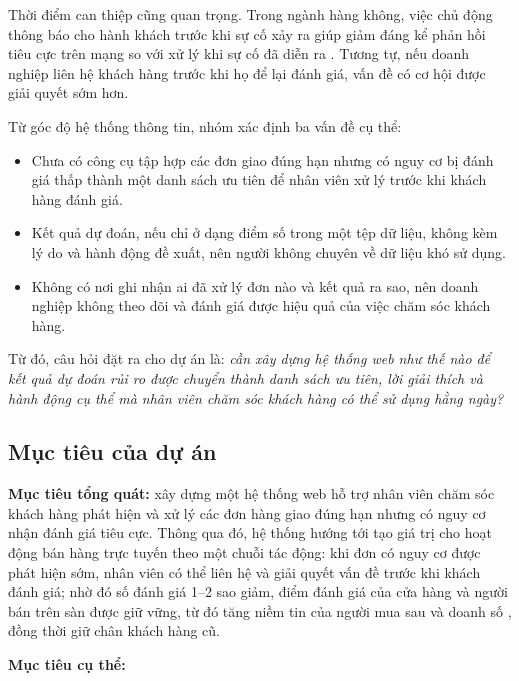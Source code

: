 Thời điểm can thiệp cũng quan trọng. Trong ngành hàng không, việc chủ động thông báo cho
hành khách trước khi sự cố xảy ra giúp giảm đáng kể phản hồi tiêu cực trên mạng so với
xử lý khi sự cố đã diễn ra \parencite{nazifi2021}. Tương tự, nếu doanh nghiệp liên hệ
khách hàng trước khi họ để lại đánh giá, vấn đề có cơ hội được giải quyết sớm hơn.

Từ góc độ hệ thống thông tin, nhóm xác định ba vấn đề cụ thể:

\begin{itemize}
    \item Chưa có công cụ tập hợp các đơn giao đúng hạn nhưng có nguy cơ bị đánh giá thấp
    thành một danh sách ưu tiên để nhân viên xử lý trước khi khách hàng đánh giá.
    \item Kết quả dự đoán, nếu chỉ ở dạng điểm số trong một tệp dữ liệu, không kèm lý do và
    hành động đề xuất, nên người không chuyên về dữ liệu khó sử dụng.
    \item Không có nơi ghi nhận ai đã xử lý đơn nào và kết quả ra sao, nên doanh nghiệp không
    theo dõi và đánh giá được hiệu quả của việc chăm sóc khách hàng.
\end{itemize}

Từ đó, câu hỏi đặt ra cho dự án là: \textit{cần xây dựng hệ thống web như thế nào để kết quả
dự đoán rủi ro được chuyển thành danh sách ưu tiên, lời giải thích và hành động cụ thể mà
nhân viên chăm sóc khách hàng có thể sử dụng hằng ngày?}

\subsection{Mục tiêu của dự án}\label{sec:muc-tieu}

\textbf{Mục tiêu tổng quát:} xây dựng một hệ thống web hỗ trợ nhân viên chăm sóc khách hàng
phát hiện và xử lý các đơn hàng giao đúng hạn nhưng có nguy cơ nhận đánh giá tiêu cực.
Thông qua đó, hệ thống hướng tới tạo giá trị cho hoạt động bán hàng trực tuyến theo một chuỗi tác
động: khi đơn có nguy cơ được phát hiện sớm, nhân viên có thể liên hệ và giải quyết vấn đề trước khi
khách đánh giá; nhờ đó số đánh giá 1--2 sao giảm, điểm đánh giá của cửa hàng và người bán trên sàn
được giữ vững, từ đó tăng niềm tin của người mua sau và doanh số \parencite{deshpande2023}, đồng
thời giữ chân khách hàng cũ.

\textbf{Mục tiêu cụ thể:}

